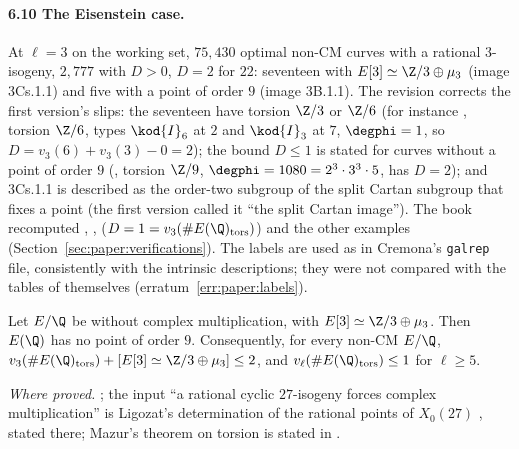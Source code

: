 \begin{sloppypar}
\paragraph{6.10 The Eisenstein case.} At $\ell=3$ on the working set, $75{,}430$ optimal non-CM curves with a rational $3$-isogeny, $2{,}777$ with $D>0$, $D=2$ for $22$: seventeen with $E[3]\simeq\Z/3\oplus\mu_3$
(image 3Cs.1.1) and five with a point of order $9$ (image 3B.1.1). The revision corrects the first version's slips: the seventeen have torsion $\Z/3$ or $\Z/6$ (for instance , torsion
$\Z/6$, types $\kod{I}_6$ at $2$ and $\kod{I}_3$ at $7$, $\degphi=1$, so $D=v_3(6)+v_3(3)-0=2$); the bound $D\le1$ is stated for curves without a point of order $9$ (, torsion $\Z/9$,
$\degphi=1080=2^3\cdot3^3\cdot5$, has $D=2$); and 3Cs.1.1 is described as the order-two subgroup of the split Cartan subgroup that fixes a point (the first version called it ``the split Cartan
image''). The book recomputed , ,  ($D=1=v_3(\#E(\Q)_{\mathrm{tors}})$) and the other examples (Section~\ref{sec:paper:verifications}). The labels are used as in Cremona's
\texttt{galrep} file, consistently with the intrinsic descriptions; they were not compared with the tables of \cite{Sutherland16} themselves (erratum~\ref{err:paper:labels}).

\begin{proposition}\label{prop:paper:no9}
Let $E/\Q$ be without complex multiplication, with $E[3]\simeq\Z/3\oplus\mu_3$. Then $E(\Q)$ has no point of order $9$. Consequently, for every non-CM $E/\Q$,
$v_3(\#E(\Q)_{\mathrm{tors}})+[E[3]\simeq\Z/3\oplus\mu_3]\le2$, and $v_\ell(\#E(\Q)_{\mathrm{tors}})\le1$ for $\ell\ge5$.
\end{proposition}

\noindent\emph{Where proved.} ; the input ``a rational cyclic $27$-isogeny forces complex multiplication'' is Ligozat's determination of the rational points of $X_0(27)$
\cite{Ligozat75}, stated there; Mazur's theorem on torsion \cite{Mazur77} is stated in .


\end{sloppypar}
